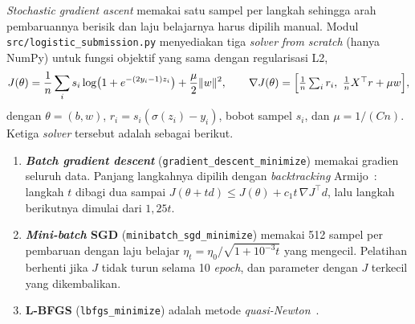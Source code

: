 \textit{Stochastic gradient ascent} memakai satu sampel per langkah sehingga arah
pembaruannya berisik dan laju belajarnya harus dipilih manual. Modul
\texttt{src/logistic\_submission.py} menyediakan tiga \textit{solver}
\textit{from scratch} (hanya NumPy) untuk fungsi objektif yang sama dengan
regularisasi L2,
\begin{equation}
	J(\theta)=\frac{1}{n}\sum_{i}s_i\log\bigl(1+e^{-(2y_i-1)z_i}\bigr)+\frac{\mu}{2}\lVert w\rVert^2,
	\qquad \nabla J(\theta)=\Bigl[\tfrac1n\textstyle\sum_i r_i,\ \tfrac1n X^\top r+\mu w\Bigr],
\end{equation}
dengan $\theta=(b,w)$, $r_i=s_i(\sigma(z_i)-y_i)$, bobot sampel $s_i$, dan
$\mu=1/(Cn)$. Ketiga \textit{solver} tersebut adalah sebagai berikut.
\begin{enumerate}
	\item \textbf{\textit{Batch gradient descent}}
	(\texttt{gradient\_descent\_minimize}) memakai gradien seluruh data. Panjang
	langkahnya dipilih dengan \textit{backtracking} Armijo~\cite{armijo1966}:
	langkah $t$ dibagi dua sampai $J(\theta+td)\le J(\theta)+c_1t\,\nabla J^\top d$,
	lalu langkah berikutnya dimulai dari $1{,}25t$.
	\item \textbf{\textit{Mini-batch} SGD} (\texttt{minibatch\_sgd\_minimize})
	memakai 512 sampel per pembaruan dengan laju belajar
	$\eta_t=\eta_0/\sqrt{1+10^{-3}t}$ yang mengecil. Pelatihan berhenti jika $J$
	tidak turun selama 10 \textit{epoch}, dan parameter dengan $J$ terkecil yang
	dikembalikan.
	\item \textbf{L-BFGS} (\texttt{lbfgs\_minimize}) adalah metode
	\textit{quasi-Newton}~\cite{liu1989lbfgs}.
\end{enumerate}

